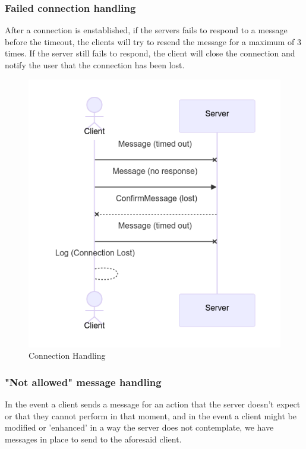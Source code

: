 \documentclass[12pt]{article}
\begin{document}
\subsubsection{Failed connection handling}
After a connection is enstablished, if the servers fails to respond to a message before the timeout, the clients will try to resend the message for a maximum of 3 times. If the server still fails to respond, the client will close the connection and notify the user that the connection has been lost.
\begin{figure}[H]
    \begin{center}
        \includegraphics[scale=0.5]{flow_connection.png}
        \caption{Connection Handling}
    \end{center}
\end{figure}

\subsubsection{"Not allowed" message handling}
In the event a client sends a message for an action that the server doesn't expect or that they cannot perform in that moment, and in the event a client might be modified or 'enhanced' in a way the server does not contemplate, we have messages in place to send to the aforesaid client.
\end{document}

